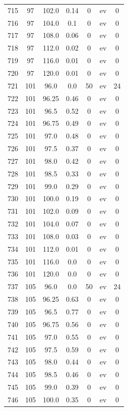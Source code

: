 \documentclass[12pt,a4paper]{article}
\begin{document}
\begin{tabular}{r|cccccc}
	715 & 97 & 102.0 & 0.14 & 0 & ev & 0 \\
	716 & 97 & 104.0 & 0.1 & 0 & ev & 0 \\
	717 & 97 & 108.0 & 0.06 & 0 & ev & 0 \\
	718 & 97 & 112.0 & 0.02 & 0 & ev & 0 \\
	719 & 97 & 116.0 & 0.01 & 0 & ev & 0 \\
	720 & 97 & 120.0 & 0.01 & 0 & ev & 0 \\
	721 & 101 & 96.0 & 0.0 & 50 & ev & 24 \\
	722 & 101 & 96.25 & 0.46 & 0 & ev & 0 \\
	723 & 101 & 96.5 & 0.52 & 0 & ev & 0 \\
	724 & 101 & 96.75 & 0.49 & 0 & ev & 0 \\
	725 & 101 & 97.0 & 0.48 & 0 & ev & 0 \\
	726 & 101 & 97.5 & 0.37 & 0 & ev & 0 \\
	727 & 101 & 98.0 & 0.42 & 0 & ev & 0 \\
	728 & 101 & 98.5 & 0.33 & 0 & ev & 0 \\
	729 & 101 & 99.0 & 0.29 & 0 & ev & 0 \\
	730 & 101 & 100.0 & 0.19 & 0 & ev & 0 \\
	731 & 101 & 102.0 & 0.09 & 0 & ev & 0 \\
	732 & 101 & 104.0 & 0.07 & 0 & ev & 0 \\
	733 & 101 & 108.0 & 0.03 & 0 & ev & 0 \\
	734 & 101 & 112.0 & 0.01 & 0 & ev & 0 \\
	735 & 101 & 116.0 & 0.0 & 0 & ev & 0 \\
	736 & 101 & 120.0 & 0.0 & 0 & ev & 0 \\
	737 & 105 & 96.0 & 0.0 & 50 & ev & 24 \\
	738 & 105 & 96.25 & 0.63 & 0 & ev & 0 \\
	739 & 105 & 96.5 & 0.77 & 0 & ev & 0 \\
	740 & 105 & 96.75 & 0.56 & 0 & ev & 0 \\
	741 & 105 & 97.0 & 0.55 & 0 & ev & 0 \\
	742 & 105 & 97.5 & 0.59 & 0 & ev & 0 \\
	743 & 105 & 98.0 & 0.44 & 0 & ev & 0 \\
	744 & 105 & 98.5 & 0.46 & 0 & ev & 0 \\
	745 & 105 & 99.0 & 0.39 & 0 & ev & 0 \\
	746 & 105 & 100.0 & 0.35 & 0 & ev & 0 \\

\end{tabular}
\end{document}
